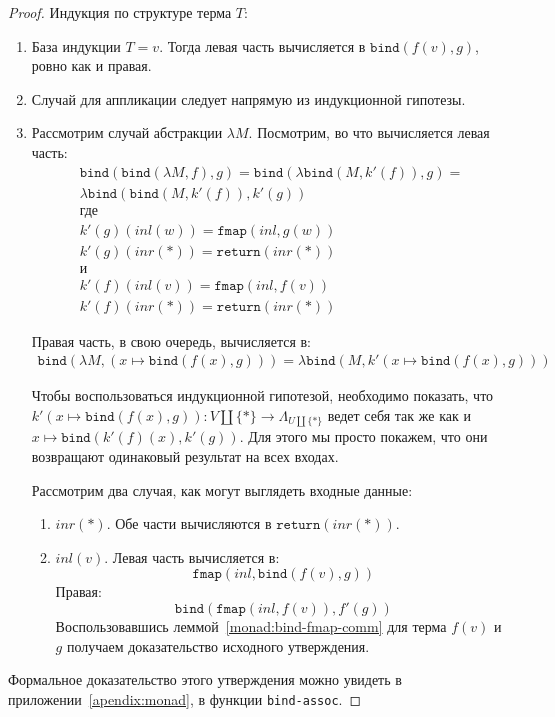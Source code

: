 \begin{proof}
  Индукция по структуре терма $T$:
  \begin{enumerate}
    \item База индукции $T = v$. Тогда левая часть вычисляется в $\texttt{bind}(f(v), g)$, ровно как и правая.
    \item Случай для аппликации следует напрямую из индукционной гипотезы.
    \item Рассмотрим случай абстракции $\lambda M$. Посмотрим, во что вычисляется левая часть:
    \begin{gather*}
      \texttt{bind}(\texttt{bind}(\lambda M, f), g) = \texttt{bind}(\lambda \texttt{bind}(M, k'(f)), g) = \\
      \lambda \texttt{bind}(\texttt{bind}(M, k'(f)), k'(g)) \\
      \text{где} \\
      k'(g)(inl(w)) = \texttt{fmap}(inl, g(w)) \\
      k'(g)(inr(*)) = \texttt{return}(inr(*)) \\
      \text{и} \\
      k'(f)(inl(v)) = \texttt{fmap}(inl, f(v)) \\
      k'(f)(inr(*)) = \texttt{return}(inr(*))
    \end{gather*}

    Правая часть, в свою очередь, вычисляется в:
    \begin{gather*}
      \texttt{bind}(\lambda M, (x \mapsto \texttt{bind}(f(x), g))) = \lambda \texttt{bind}(M, k'(x \mapsto \texttt{bind}(f(x), g)))
    \end{gather*}

    Чтобы воспользоваться индукционной гипотезой, необходимо показать, что $k'(x \mapsto \texttt{bind}(f(x), g)) : V \coprod \{*\} \to \Lambda_{U \coprod \{*\}}$ ведет себя так же как и $x \mapsto \texttt{bind}(k'(f)(x), k'(g))$. Для этого мы просто покажем, что они возвращают одинаковый результат на всех входах.

    Рассмотрим два случая, как могут выглядеть входные данные:
    \begin{enumerate}
      \item $inr(*)$. Обе части вычисляются в $\texttt{return}(inr(*))$.
      \item $inl(v)$. Левая часть вычисляется в: $$ \texttt{fmap}(inl, \texttt{bind}(f(v), g)) $$
      Правая: $$\texttt{bind}(\texttt{fmap}(inl, f(v)), f'(g))$$
      Воспользовавшись леммой~\ref{monad:bind-fmap-comm} для терма $f(v)$ и $g$ получаем доказательство исходного утверждения. \qedhere
    \end{enumerate}
  \end{enumerate}

  Формальное доказательство этого утверждения можно увидеть в приложении~\ref{apendix:monad}, в функции \texttt{bind-assoc}.
\end{proof}

